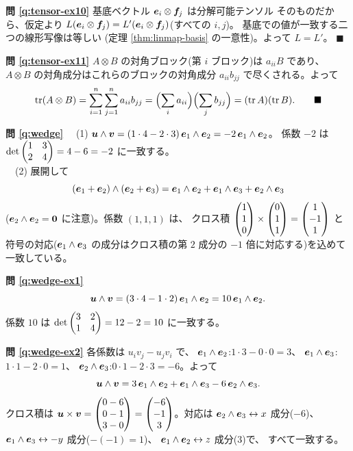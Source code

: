 \bigskip
\noindent\textbf{問 \ref{q:tensor-ex10}}\quad
基底ベクトル $\bm{e}_i \otimes \bm{f}_j$ は分解可能テンソル
そのものだから、仮定より $L(\bm{e}_i \otimes \bm{f}_j)
= L'(\bm{e}_i \otimes \bm{f}_j)$(すべての $i, j$)。
基底での値が一致する二つの線形写像は等しい
(定理 \ref{thm:linmap-basis} の一意性)。よって $L = L'$。 $\blacksquare$

\bigskip
\noindent\textbf{問 \ref{q:tensor-ex11}}\quad
$A \otimes B$ の対角ブロック(第 $i$ ブロック)は $a_{ii}B$ であり、
$A \otimes B$ の対角成分はこれらのブロックの対角成分
$a_{ii}b_{jj}$ で尽くされる。よって
\[
\mathrm{tr}(A \otimes B) = \sum_{i=1}^{n}\sum_{j=1}^{n} a_{ii}b_{jj}
= \Bigl(\sum_{i} a_{ii}\Bigr)\Bigl(\sum_{j} b_{jj}\Bigr)
= (\mathrm{tr}\,A)(\mathrm{tr}\,B). \qquad\blacksquare
\]

\bigskip
\noindent\textbf{問 \ref{q:wedge}}\quad
　(1) $\bm{u} \wedge \bm{v} = (1 \cdot 4 - 2 \cdot 3)\,
\bm{e}_1 \wedge \bm{e}_2 = -2\,\bm{e}_1 \wedge \bm{e}_2$。
係数 $-2$ は $\det \begin{pmatrix}1 & 3 \\ 2 & 4\end{pmatrix} = 4 - 6 = -2$ に一致する。\\
　(2) 展開して
\[
(\bm{e}_1 + \bm{e}_2) \wedge (\bm{e}_2 + \bm{e}_3)
= \bm{e}_1 \wedge \bm{e}_2 + \bm{e}_1 \wedge \bm{e}_3
+ \bm{e}_2 \wedge \bm{e}_3
\]
($\bm{e}_2 \wedge \bm{e}_2 = \bm{0}$ に注意)。係数 $(1, 1, 1)$ は、
クロス積 $\begin{pmatrix}1 \\ 1 \\ 0\end{pmatrix} \times \begin{pmatrix}0 \\ 1 \\ 1\end{pmatrix} = \begin{pmatrix}1 \\ -1 \\ 1\end{pmatrix}$ と
符号の対応($\bm{e}_1 \wedge \bm{e}_3$ の成分はクロス積の第 $2$ 成分の
$-1$ 倍に対応する)を込めて一致している。

\bigskip
\noindent\textbf{問 \ref{q:wedge-ex1}}\quad
\[
\bm{u} \wedge \bm{v} = (3 \cdot 4 - 1 \cdot 2)\,
\bm{e}_1 \wedge \bm{e}_2 = 10\,\bm{e}_1 \wedge \bm{e}_2.
\]
係数 $10$ は $\det\begin{pmatrix}3 & 2 \\ 1 & 4\end{pmatrix} = 12 - 2 = 10$ に一致する。

\bigskip
\noindent\textbf{問 \ref{q:wedge-ex2}}\quad
各係数は $u_i v_j - u_j v_i$ で、
$\bm{e}_1 \wedge \bm{e}_2$:$1 \cdot 3 - 0 \cdot 0 = 3$、
$\bm{e}_1 \wedge \bm{e}_3$:$1 \cdot 1 - 2 \cdot 0 = 1$、
$\bm{e}_2 \wedge \bm{e}_3$:$0 \cdot 1 - 2 \cdot 3 = -6$。よって
\[
\bm{u} \wedge \bm{v} = 3\,\bm{e}_1 \wedge \bm{e}_2
+ \bm{e}_1 \wedge \bm{e}_3 - 6\,\bm{e}_2 \wedge \bm{e}_3.
\]
クロス積は $\bm{u} \times \bm{v} = \begin{pmatrix}0 - 6 \\ 0 - 1 \\ 3 - 0\end{pmatrix}
= \begin{pmatrix}-6 \\ -1 \\ 3\end{pmatrix}$。対応は
$\bm{e}_2 \wedge \bm{e}_3 \leftrightarrow x$ 成分($-6$)、
$\bm{e}_1 \wedge \bm{e}_3 \leftrightarrow -y$ 成分($-(-1) = 1$)、
$\bm{e}_1 \wedge \bm{e}_2 \leftrightarrow z$ 成分($3$)で、
すべて一致する。

